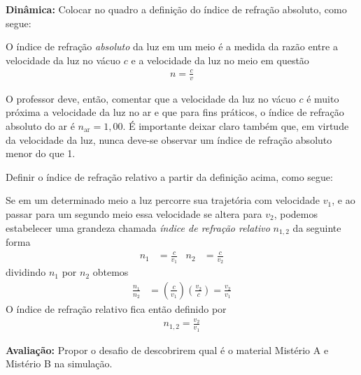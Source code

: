         \noindent \textbf{Dinâmica:} Colocar no quadro a definição do índice de refração absoluto, como segue:
        \begin{definicao}
            O índice de refração \emph{absoluto} da luz em um meio é a medida da razão entre a velocidade da luz no vácuo $c$ e a velocidade da luz no meio em questão
            \begin{align}
            \boxed{
                n=\frac{c}{v}
            }                
            \end{align}
        \end{definicao}
        O professor deve, então, comentar que a velocidade da luz no vácuo $c$ é muito próxima a velocidade da luz no ar e que para fins práticos, o índice de refração absoluto do ar é $n_{\text{ar}}=1,00$. É importante deixar claro também que, em virtude da velocidade da luz, nunca deve-se observar um índice de refração absoluto menor do que 1.

        Definir o índice de refração relativo a partir da definição acima, como segue:

        Se em um determinado meio a luz percorre sua trajetória com velocidade $v_1$, e ao passar para um segundo meio essa velocidade se altera para $v_2$, podemos estabelecer uma grandeza chamada \emph{índice de refração relativo} $n_{1,2}$ da seguinte forma
        \begin{align}
            n_1& =\frac{c}{v_1} & n_2& =\frac{c}{v_2}            
        \end{align}
        dividindo $n_1$ por $n_2$ obtemos
        \begin{align}
            \frac{n_1}{n_2}&=\left(\frac{c}{v_1}\right)\left(\frac{v_2}{c}\right)=\frac{v_2}{v_1}
        \end{align}
        O índice de refração relativo fica então definido por
        \begin{align}
            \boxed{
                n_{1,2}=\frac{v_2}{v_1}
            }
        \end{align}
        \par\noindent\textbf{Avaliação:} Propor o desafio de descobrirem qual é o material Mistério A e Mistério B na simulação.





